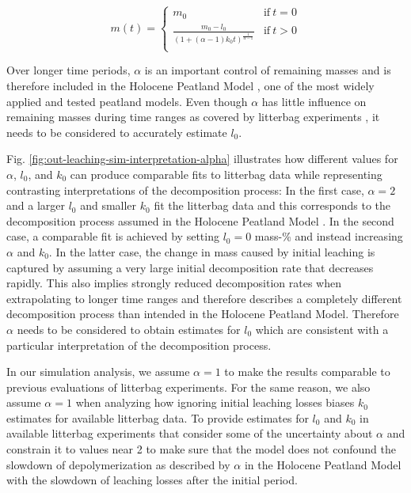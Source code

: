 \documentclass[bg, manuscript]{copernicus}
\begin{document}
\begin{equation}
m(t) = \begin{cases}
m_0 & \mathrm{if}~t=0\\
\frac{m_0 - l_0}{(1 + (\alpha - 1) k_0 t)^{\frac{1}{\alpha - 1}}} & \mathrm{if}~t>0\\
\end{cases}
\label{eq:decomposition-solution-2-with-leaching-1}
\end{equation}

Over longer time periods, \(\alpha\) is an important control of remaining masses \citep{Frolking.2001} and is therefore included in the Holocene Peatland Model \citep{Frolking.2010}, one of the most widely applied and tested peatland models. Even though \(\alpha\) has little influence on remaining masses during time ranges as covered by litterbag experiments \citep{Frolking.2001, Frolking.2010}, it needs to be considered to accurately estimate \(l_0\).

Fig. \ref{fig:out-leaching-sim-interpretation-alpha} illustrates how different values for \(\alpha\), \(l_0\), and \(k_0\) can produce comparable fits to litterbag data while representing contrasting interpretations of the decomposition process: In the first case, \(\alpha=2\) and a larger \(l_0\) and smaller \(k_0\) fit the litterbag data and this corresponds to the decomposition process assumed in the Holocene Peatland Model \citep{Frolking.2010}. In the second case, a comparable fit is achieved by setting \(l_0=0\) mass-\% and instead increasing \(\alpha\) and \(k_0\). In the latter case, the change in mass caused by initial leaching is captured by assuming a very large initial decomposition rate that decreases rapidly. This also implies strongly reduced decomposition rates when extrapolating to longer time ranges and therefore describes a completely different decomposition process than intended in the Holocene Peatland Model. Therefore \(\alpha\) needs to be considered to obtain estimates for \(l_0\) which are consistent with a particular interpretation of the decomposition process.

In our simulation analysis, we assume \(\alpha = 1\) to make the results comparable to previous evaluations of litterbag experiments. For the same reason, we also assume \(\alpha = 1\) when analyzing how ignoring initial leaching losses biases \(k_0\) estimates for available litterbag data. To provide estimates for \(l_0\) and \(k_0\) in available litterbag experiments that consider some of the uncertainty about \(\alpha\) and constrain it to values near 2 to make sure that the model does not confound the slowdown of depolymerization as described by \(\alpha\) in the Holocene Peatland Model with the slowdown of leaching losses after the initial period.
\end{document}
